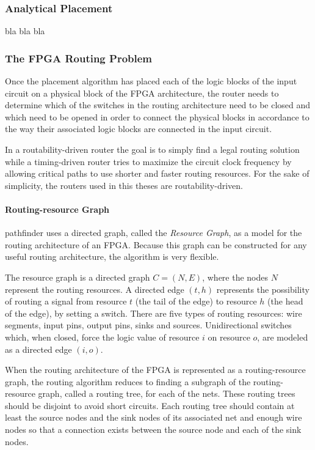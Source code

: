 \documentclass[a4paper,oneside,12pt]{article}
\begin{document}
\subsubsection{Analytical Placement}
bla bla bla

\subsubsection{The FPGA Routing Problem}
Once the placement algorithm has placed each of the logic blocks of the input circuit on a physical block of the FPGA architecture, the router needs to determine which of the switches in the routing architecture need to be closed and which need to be opened in order to connect the physical blocks in accordance to the way their associated logic blocks are connected in the input circuit.

In a routability-driven router the goal is to simply find a legal routing solution while a timing-driven router tries to maximize the circuit clock frequency by allowing critical paths to use shorter and faster routing resources. For the sake of simplicity, the routers used in this theses are routability-driven.

\paragraph{Routing-resource Graph}
{\sc pathfinder} \cite{mcmurchie1995panprff} uses a directed graph, called the {\em Resource Graph}, as a model for the routing architecture of an FPGA.  Because this graph can be constructed for any useful routing architecture, the algorithm is very flexible. 

The resource graph is a directed graph $C=(N,E)$, where the nodes $N$ represent the routing resources. A directed edge $(t,h)$ represents the possibility of routing a signal from resource $t$ (the tail of the edge) to resource $h$ (the head of the edge), by setting a switch. There are five types of routing resources: wire segments, input pins, output pins, sinks and sources. Unidirectional switches which, when closed, force the logic value of resource $i$ on resource $o$, are modeled as a directed edge $(i,o)$.

When the routing architecture of the FPGA is represented as a routing-resource graph, the routing algorithm reduces to finding a subgraph of the routing-resource graph, called a routing tree, for each of the nets. These routing trees should be disjoint to avoid short circuits. Each routing tree should contain at least the source nodes and the sink nodes of its associated net and enough wire nodes so that a connection exists between the source node and each of the sink nodes.
\end{document}
